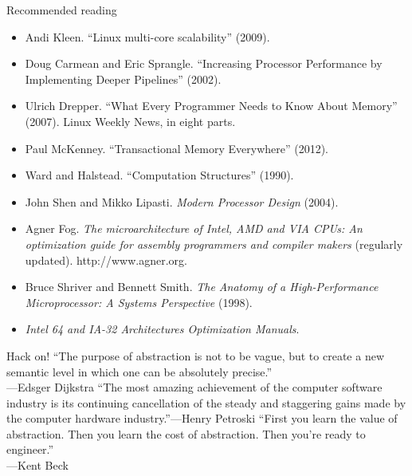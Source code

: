 \documentclass[mathserif,xcolor={dvipsnames,table}]{beamer}
\begin{document}
\begin{frame}{Recommended reading}
\footnotesize{
\begin{itemize}
\item Andi Kleen. ``Linux multi-core scalability'' (2009).
\item Doug Carmean and Eric Sprangle. ``Increasing Processor Performance by Implementing Deeper Pipelines'' (2002).
\item Ulrich Drepper. ``What Every Programmer Needs to Know About Memory'' (2007). Linux Weekly News, in eight parts.
\item Paul McKenney. ``Transactional Memory Everywhere'' (2012).
\item Ward and Halstead. ``Computation Structures'' (1990).
\item John Shen and Mikko Lipasti. \textit{Modern Processor Design} (2004).
\item Agner Fog. \textit{The microarchitecture of Intel, AMD and VIA CPUs: An optimization guide for assembly programmers and compiler makers} (regularly updated). http://www.agner.org.
\item Bruce Shriver and Bennett Smith. \textit{The Anatomy of a High-Performance Microprocessor: A Systems Perspective} (1998).
\item \textit{Intel 64 and IA-32 Architectures Optimization Manuals}.
\end{itemize}
}
\end{frame}

\begin{frame}{Hack on!}
``The purpose of abstraction is not to be vague, but to create a new semantic level in which one can be absolutely precise.''\\
\hfill---Edsger Dijkstra
\vfill
``The most amazing achievement of the computer software industry is its 
continuing cancellation of the steady and staggering gains made by the 
computer hardware industry.''\hfill---Henry Petroski
\vfill
\vfill
``First you learn the value of abstraction. Then you learn the cost of abstraction. Then you're ready to engineer.''\\
\hfill---Kent Beck
\end{frame}

\begin{frame}
\end{frame}
\end{document}
